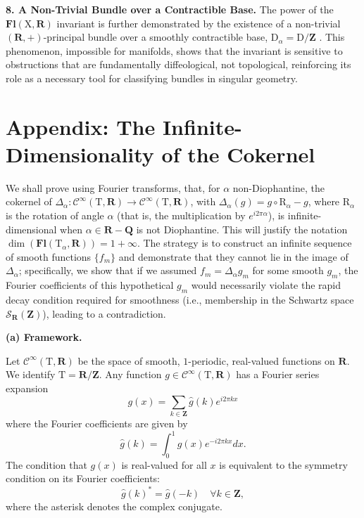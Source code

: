 \documentclass[10pt,letterpaper,reqno]{amsart}
\theoremstyle{article}
\newcommand{\1}{{\hat 1}}
\newcommand{\0}{{\hat 0}}
\newcommand{\QQ}{\mathbf Q}
\newcommand{\RR}{\mathbf R}
\newcommand{\ZZ}{\mathbf Z}
\newcommand{\cS}{{\mathcal S}}
\def \D{\mathrm D}
\def \R{\mathrm R}
\def \T{\mathrm T}
\def \X{\mathrm X}
\newcommand{\Cinfty}{\mathcal{C}^\infty}
\DeclareMathOperator{\Fb}{\boldsymbol{\mathsf{Fl}}}
\renewcommand{\Fb}{\mathbf{Fl}}
\begin{document}
    \textbf{8. A Non-Trivial Bundle over a Contractible Base.} The power of the $\Fb(\X, \RR)$ invariant is further demonstrated by the existence of a non-trivial $(\RR,+)$-principal bundle over a smoothly contractible base, $\D_\alpha = \D/\ZZ$ \cite{PIZ-ANTRB}. This phenomenon, impossible for manifolds, shows that the invariant is sensitive to obstructions that are fundamentally diffeological, not topological, reinforcing its role as a necessary tool for classifying bundles in singular geometry.
    

  \section*{Appendix: The Infinite-Dimensionality of the Cokernel}
  
    We shall prove using Fourier transforms,
    that,
    for $\alpha$ non-Diophantine,
    the cokernel of $\Delta_\alpha: \Cinfty(\T, \RR) \to \Cinfty(\T, \RR)$,
    with $\Delta_\alpha(g) = g \circ \R_\alpha - g$,
    where $\R_\alpha$ is the rotation of angle $\alpha$ (that is, the multiplication by $e^{i2\pi\alpha}$),
    is infinite-dimensional when $\alpha \in \RR - \QQ$ is not Diophantine.
    This will justify the notation $\dim(\Fb(\T_\alpha,\RR)) = 1 + \infty$.
    The strategy is to construct an infinite sequence of smooth functions $\{f_m\}$ and demonstrate that they cannot lie in the image of $\Delta_\alpha$;
    specifically,
    we show that if we assumed $f_m = \Delta_\alpha g_m$ for some smooth $g_m$,
    the Fourier coefficients of this hypothetical $g_m$ would necessarily violate the rapid decay condition required for smoothness
    (i.e., membership in the Schwartz space $\cS_{\RR}(\ZZ)$),
    leading to a contradiction.
    
    \textbf{(a) Framework.}
    
    Let $\Cinfty(\T,\RR)$ be the space of smooth,
    $1$-periodic,
    real-valued functions on $\RR$.
    We identify $\T = \RR/\ZZ$.
    Any function $g \in \Cinfty(\T,\RR)$ has a Fourier series expansion
    $$
      g(x) = \sum_{k \in \ZZ} \hat{g}(k) e^{i2\pi k x}
      $$
    where the Fourier coefficients are given by
    $$
      \hat{g}(k) = \int_0^1 g(x) e^{-i2\pi k x} dx.
      $$
    The condition that $g(x)$ is real-valued for all $x$ is equivalent to the symmetry condition on its Fourier coefficients:
    $$
      {\hat{g}(k)}^* = \hat{g}(-k) \quad \forall k \in \ZZ,
      $$
    where the asterisk denotes the complex conjugate.
    
\end{document}

